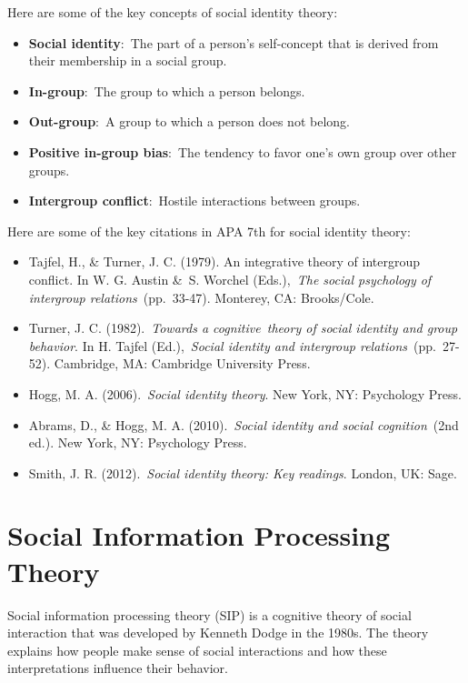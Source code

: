 \documentclass[
]{book}
\begin{document}
Here are some of the key concepts of social identity theory:

\begin{itemize}
\item
  \textbf{Social identity}:~The part of a person's self-concept that is derived from their membership in a social group.
\item
  \textbf{In-group}:~The group to which a person belongs.
\item
  \textbf{Out-group}:~A group to which a person does not belong.
\item
  \textbf{Positive in-group bias}:~The tendency to favor one's own group over other groups.
\item
  \textbf{Intergroup conflict}:~Hostile interactions between groups.
\end{itemize}

Here are some of the key citations in APA 7th for social identity theory:

\begin{itemize}
\item
  Tajfel, H., \& Turner, J. C. (1979). An integrative theory of intergroup conflict. In W. G. Austin \&~S. Worchel (Eds.),~\emph{The social psychology of intergroup relations}~(pp.~33-47). Monterey, CA: Brooks/Cole.
\item
  Turner, J. C. (1982).~\emph{Towards a cognitive~theory of social identity and group behavior}. In H. Tajfel (Ed.),~\emph{Social identity and intergroup relations}~(pp.~27-52). Cambridge, MA: Cambridge University Press.
\item
  Hogg, M. A. (2006).~\emph{Social identity theory}. New York, NY: Psychology Press.
\item
  Abrams, D., \& Hogg, M. A. (2010).~\emph{Social identity and social cognition}~(2nd ed.). New York, NY: Psychology Press.
\item
  Smith, J. R. (2012).~\emph{Social identity theory: Key readings}. London, UK: Sage.
\end{itemize}

\section{Social Information Processing Theory}\label{social-information-processing-theory}

Social information processing theory (SIP) is a cognitive theory of social interaction that was developed by Kenneth Dodge in the 1980s. The theory explains how people make sense of social interactions and how these interpretations influence their behavior.
\end{document}
